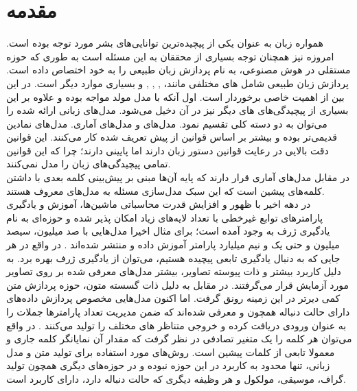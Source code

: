 \chapter{مقدمه}\label{Chap:Chap1}
\minitoc
همواره زبان به عنوان یکی از پیچیده‌ترین توانایی‌های بشر مورد توجه بوده است. امروزه نیز همچنان توجه بسیاری از محققان به این مسئله است به طوری که حوزه مستقلی در هوش مصنوعی، به نام پردازش زبان طبیعی را به خود اختصاص داده است. پردازش زبان طبیعی شامل
های
مختلفی مانند،
,
,
,
و بسیاری موارد دیگر است. در این بین \task{}
از اهمیت خاصی برخوردار است. اول آنکه با مدل مولد مواجه بوده و علاوه بر این بسیاری از پیچیدگی‌های \task{}‌های دیگر نیز در آن دخیل می‌شود.
مدل‌های زبانی ارائه شده را می‌توان به دو دسته کلی تقسیم نمود. مدل‌های 
و مدل‌های آماری. مدل‌های نمادین قدیمی‌تر بوده و بیشتر بر اساس قوانین از پیش تعریف شده کار می‌کنند. این قوانین دقت بالایی در رعایت قوانین دستور زبان دارند اما
پایینی دارند؛ چرا که این قوانین تمامی پیچیدگی‌های زبان را مدل نمی‌کنند.\\
در مقابل مدل‌های آماری قرار دارند که پایه آن‌ها مبنی بر پیش‌بینی کلمه بعدی با داشتن کلمه‌های پیشین است که این سبک مدل‌سازی مسئله به مدل‌های 
معروف هستند. \\
در دهه اخیر با ظهور
و افزایش قدرت محاسباتی ماشین‌ها، آموزش و یادگیری پارامترهای توابع غیرخطی با تعداد لایه‌های زیاد امکان پذیر شده و حوزه‌ای به نام یادگیری ژرف به وجود آمده است؛ برای مثال اخیرا مدل‌هایی با صد میلیون، سیصد میلیون و حتی یک و نیم میلیارد پارامتر آموزش داده و منتشر شده‌اند \cite{bert}. در واقع در هر جایی که به دنبال یادگیری تابعی پیچیده هستیم، می‌توان از یادگیری ژرف بهره برد. به دلیل کاربرد بیشتر و ذات پیوسته تصاویر، بیشتر مدل‌های معرفی شده بر روی تصاویر مورد آزمایش قرار می‌گرفتند. در مقابل به دلیل ذات گسسته متون، حوزه پردازش متن کمی دیرتر در این زمینه رونق گرفت. اما اکنون مدل‌هایی مخصوص پردازش داده‌های دارای حالت دنباله همچون 
 و \transformer{} معرفی شده‌اند که ضمن مدیریت تعداد پارامتر‌ها جملات را به عنوان ورودی دریافت کرده و خروجی متناظر \task{}های مختلف را تولید می‌کنند \cite{transformer, lstm}. در واقع می‌توان هر کلمه را یک متغیر تصادفی در نظر گرفت که مقدار آن نمایانگر کلمه جاری و معمولا تابعی از کلمات پیشین است. روش‌های مورد استفاده برای تولید متن و مدل زبانی، تنها محدود به کاربرد در این حوزه نبوده و در حوزه‌های دیگری همچون تولید گراف، موسیقی، مولکول و هر وظیفه دیگری که حالت دنباله دارد، دارای کاربرد است.\\
